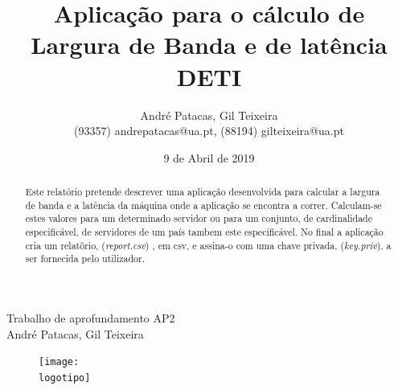 \documentclass{report}
\begin{document}
%

\def\titulo{Trabalho de aprofundamento AP2}
\def\data{9 de Abril de 2019}
\def\autores{André Patacas, Gil Teixeira}
\def\autorescontactos{(93357) andrepatacas@ua.pt, (88194) gilteixeira@ua.pt}
\def\departamento{DETI}
\def\logotipo{ua.pdf}
%
%
\begin{titlepage}

\begin{center}
%
\vspace*{50mm}
%
{\Huge \titulo}\\ 
%
\vspace{10mm}
%
{\LARGE \autores}\\ 
%
\vspace{30mm}
%
\begin{figure}[h]
\center
\texttt{[image: \\logotipo]}
\end{figure}
%
\vspace{30mm}
\end{center}
%
\begin{flushright}

\end{flushright}
\end{titlepage}

\title{%
{\Huge\textbf{Aplicação para o cálculo de Largura de Banda e de latência}}\\
{\Large \departamento}
}
%
\author{%
    \autores \\
    \autorescontactos 
}

%
\date{\data}
%
\maketitle






\tableofcontents


\clearpage
{}

\begin{abstract}
Este relatório pretende descrever uma aplicação desenvolvida para calcular a largura de banda e a latência da máquina onde a aplicação se encontra a correr. Calculam-se estes valores para um determinado servidor ou para um conjunto, de cardinalidade especificável, de servidores de um país tambem este especificável. No final a aplicação cria um relatõrio, (\textit{report.csv}) , em csv, e assina-o com uma chave privada, (\textit{key.priv}), a ser fornecida pelo utilizador.

\end{abstract}
\end{document}

